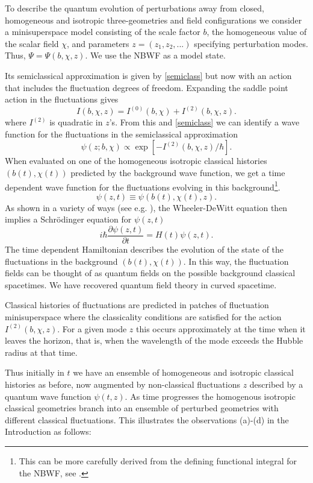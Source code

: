 \documentclass[prd,floats,superscriptaddress,eqsecnum,floatfix,nofootinbib,12pt]{revtex4}
\def\be{\begin{equation}}
\def\ee{\end{equation}}
\def\jf{}
\def\epb{{(2)}}
\begin{document}
{{{{To describe the quantum evolution of perturbations away from closed, homogeneous and isotropic three-geometries and field configurations we consider a minisuperspace model consisting of the scale factor $b$, the homogeneous value of the scalar field $\chi$, and parameters $z=(z_1,z_2,...)$ specifying  perturbation modes. Thus, $\Psi=\Psi(b,\chi, z)$. We use the NBWF as a model state. {\jf Its semiclassical approximation is given by \eqref{semiclass} but now with an action that includes the fluctuation degrees of freedom. Expanding the saddle point action in the fluctuations gives 
\begin{equation}
I(b,\chi,z) = I^{(0)}(b,\chi) + I^\epb (b,\chi,z) .
\label{pertaction}
\end{equation}
where $I^\epb$ is quadratic in $z$'s. 
From this and \eqref{semiclass} we can identify a wave function for the fluctuations in the semiclassical approximation
\be
\psi(z;b,\chi) \propto \exp[-I^\epb (b,\chi,z)/\hbar] .
\label{semiclass-flucts}
\ee
When evaluated on one of the homogeneous isotropic classical histories $(b(t),\chi(t))$ predicted by the background wave function, we get a time dependent wave function for the fluctuations evolving in this background\footnote{This can be more carefully derived from the defining functional integral for the NBWF, see \cite{HHH10a}.}.
\begin{equation}
\psi(z,t) \equiv \psi(b(t),\chi(t),z).
\label{wfot}
\end{equation} 
As shown in a variety of ways (see e.g. \cite{Har87}),  the Wheeler-DeWitt equation then implies a Schr\"odinger equation for $\psi(z,t)$
\begin{equation}
i\hbar \frac{\partial\psi(z,t)}{\partial t} = H(t) \psi(z,t)  . 
\label{seqn}
\end{equation}
The time dependent Hamiltonian describes the evolution of the state of the fluctuations in the background $(b(t),\chi(t))$. In this way, the fluctuation fields can be thought of as quantum fields on the possible background classical spacetimes.  We have recovered quantum field theory in curved spacetime. 

Classical histories of fluctuations are predicted in patches of fluctuation minisuperspace where the classicality conditions are satisfied for the action $I^{(2)}(b,\chi,z)$. For a given mode $z$ this occurs approximately at the time when it leaves the horizon, that is, when the wavelength of the mode exceeds the Hubble radius at that time. 

Thus initially in $t$ we have an ensemble of homogeneous and isotropic classical histories as before, now augmented by non-classical fluctuations $z$ described by a quantum wave function $\psi(t,z)$. As time progresses the homogenous isotropic classical geometries branch into an ensemble of perturbed geometries with different classical fluctuations.  This illustrates the observations (a)-(d) in the Introduction as follows:

}}}}}
\end{document}
